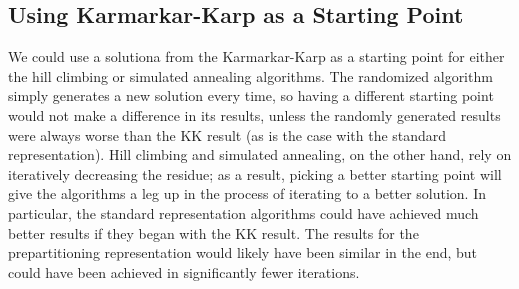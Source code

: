 \documentclass[solution, letterpaper]{cs121}
\begin{document}
\subsection*{Using Karmarkar-Karp as a Starting Point}
\hspace{4mm} We could use a solutiona from the Karmarkar-Karp as a starting point for either the hill climbing or simulated annealing algorithms. The randomized algorithm simply generates a new solution every time, so having a different starting point would not make a difference in its results, unless the randomly generated results were always worse than the KK result (as is the case with the standard representation). Hill climbing and simulated annealing, on the other hand, rely on iteratively decreasing the residue; as a result, picking a better starting point will give the algorithms a leg up in the process of iterating to a better solution. In particular, the standard representation algorithms could have achieved much better results if they began with the KK result. The results for the prepartitioning representation would likely have been similar in the end, but could have been achieved in significantly fewer iterations.
\end{document}
